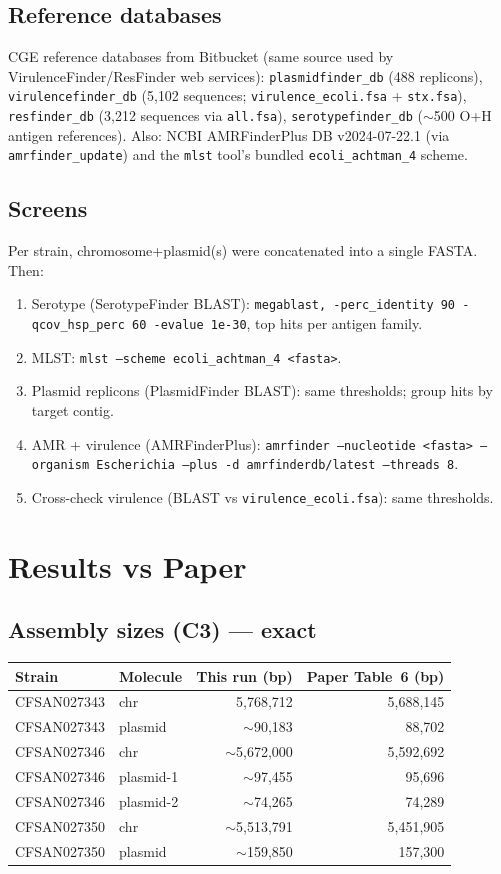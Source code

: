 \documentclass[11pt,letterpaper]{article}
\begin{document}
\subsection{Reference databases}
CGE reference databases from Bitbucket (same source used by
VirulenceFinder/ResFinder web services): \texttt{plasmidfinder\_db} (488 replicons),
\texttt{virulencefinder\_db} (5{,}102 sequences; \texttt{virulence\_ecoli.fsa} +
\texttt{stx.fsa}), \texttt{resfinder\_db} (3{,}212 sequences via \texttt{all.fsa}),
\texttt{serotypefinder\_db} ($\sim$500 O+H antigen references). Also: NCBI
AMRFinderPlus DB v2024-07-22.1 (via \texttt{amrfinder\_update}) and the \texttt{mlst}
tool's bundled \texttt{ecoli\_achtman\_4} scheme.

\subsection{Screens}
Per strain, chromosome+plasmid(s) were concatenated into a single FASTA. Then:
\begin{enumerate}[nosep]
  \item Serotype (SerotypeFinder BLAST): \texttt{megablast, -perc\_identity 90 -qcov\_hsp\_perc 60 -evalue 1e-30}, top hits per antigen family.
  \item MLST: \texttt{mlst --scheme ecoli\_achtman\_4 <fasta>}.
  \item Plasmid replicons (PlasmidFinder BLAST): same thresholds; group hits by target contig.
  \item AMR + virulence (AMRFinderPlus): \texttt{amrfinder --nucleotide <fasta> --organism Escherichia --plus -d amrfinderdb/latest --threads 8}.
  \item Cross-check virulence (BLAST vs \texttt{virulence\_ecoli.fsa}): same thresholds.
\end{enumerate}

\section{Results vs Paper}

\subsection{Assembly sizes (C3) --- exact}
\begin{tabular}{@{}llrr@{}}
\toprule
Strain & Molecule & This run (bp) & Paper Table~6 (bp) \\
\midrule
CFSAN027343 & chr        & 5{,}768{,}712 & 5{,}688{,}145 \\
CFSAN027343 & plasmid    & $\sim$90{,}183 & 88{,}702 \\
CFSAN027346 & chr        & $\sim$5{,}672{,}000 & 5{,}592{,}692 \\
CFSAN027346 & plasmid-1  & $\sim$97{,}455 & 95{,}696 \\
CFSAN027346 & plasmid-2  & $\sim$74{,}265 & 74{,}289 \\
CFSAN027350 & chr        & $\sim$5{,}513{,}791 & 5{,}451{,}905 \\
CFSAN027350 & plasmid    & $\sim$159{,}850 & 157{,}300 \\
\bottomrule
\end{tabular}
\end{document}
